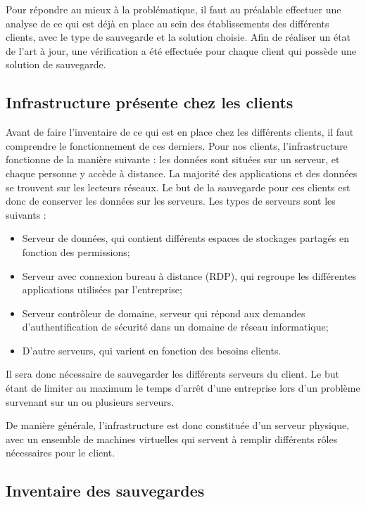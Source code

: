 \documentclass[pfe]{tnreport} %
\begin{document}
Pour répondre au mieux à la problématique, il faut au préalable effectuer une analyse de ce qui est déjà en place au sein des établissements des différents clients, avec le type de sauvegarde et la solution choisie.
Afin de réaliser un état de l'art à jour, une vérification a été effectuée pour chaque client qui possède une solution de sauvegarde. 

\subsection{Infrastructure présente chez les clients}

Avant de faire l'inventaire de ce qui est en place chez les différents clients, il faut comprendre le fonctionnement de ces derniers.
Pour nos clients, l'infrastructure fonctionne de la manière suivante : les données sont situées sur un serveur, et chaque personne y accède à distance. La majorité des applications et des données se trouvent sur les lecteurs réseaux. \newline
Le but de la sauvegarde pour ces clients est donc de conserver les données sur les serveurs.
Les types de serveurs sont les suivants : \newline
\begin{itemize}
 \item Serveur de données, qui contient différents espaces de stockages partagés en fonction des permissions;
 \item Serveur avec connexion bureau à distance (RDP), qui regroupe les différentes applications utilisées par l'entreprise;
 \item Serveur contrôleur de domaine, serveur qui répond aux demandes d'authentification de sécurité dans un domaine de réseau informatique;
 \item D'autre serveurs, qui varient en fonction des besoins clients. \newline
\end{itemize}
 Il sera donc nécessaire de sauvegarder les différents serveurs du client. \newline
 Le but étant de limiter au maximum le temps d'arrêt d'une entreprise lors d'un problème survenant sur un ou plusieurs serveurs.
 
De manière générale, l'infrastructure est donc constituée d'un serveur physique, avec un ensemble de machines virtuelles qui servent à remplir différents rôles nécessaires pour le client.


\subsection{Inventaire des sauvegardes}
\end{document}

